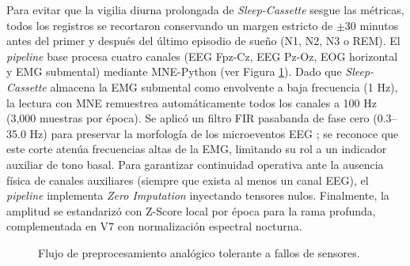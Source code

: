 \documentclass[conference]{IEEEtran}
\begin{document}
Para evitar que la vigilia diurna prolongada de \textit{Sleep-Cassette} sesgue las métricas, todos los registros se recortaron conservando un margen estricto de $\pm$30 minutos antes del primer y después del último episodio de sueño (N1, N2, N3 o REM). El \textit{pipeline} base procesa cuatro canales (EEG Fpz-Cz, EEG Pz-Oz, EOG horizontal y EMG submental) mediante MNE-Python \cite{gramfort2013} (ver Figura \ref{fig:pipeline_stateless}). Dado que \textit{Sleep-Cassette} almacena la EMG submental como envolvente a baja frecuencia (1 Hz), la lectura con MNE remuestrea automáticamente todos los canales a 100 Hz (3,000 muestras por época). Se aplicó un filtro FIR pasabanda de fase cero (0.3--35.0 Hz) para preservar la morfología de los microeventos EEG \cite{berry2020}; se reconoce que este corte atenúa frecuencias altas de la EMG, limitando su rol a un indicador auxiliar de tono basal. Para garantizar continuidad operativa ante la ausencia física de canales auxiliares (siempre que exista al menos un canal EEG), el \textit{pipeline} implementa \textit{Zero Imputation} inyectando tensores nulos. Finalmente, la amplitud se estandarizó con Z-Score local por época para la rama profunda, complementada en V7 con normalización espectral nocturna.

\begin{figure}[htbp]
\centering
{}
\caption{Flujo de preprocesamiento analógico tolerante a fallos de sensores.}
\label{fig:pipeline_stateless}
\end{figure}
\end{document}
